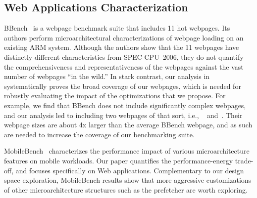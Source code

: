 \subsection{Web Applications Characterization}
\label{sec:arch:related:char}

BBench~\cite{BBench} is a webpage benchmark suite that includes 11 hot webpages. Its authors perform microarchitectural characterizations of webpage loading on an existing ARM system. Although the authors show that the 11 webpages have distinctly different characteristics from SPEC CPU~2006, they do not quantify the comprehensiveness and representativeness of the webpages against the vast number of webpages ``in the wild.'' In stark contrast, our analysis in~ systematically proves the broad coverage of our webpages, which is needed for robustly evaluating the impact of the optimizations that we propose. For example, we find that BBench does not include significantly complex webpages, and our analysis led to including two webpages of that sort, i.e., ~ and~. Their webpage sizes are about 4x larger than the average BBench webpage, and as such are needed to increase the coverage of our benchmarking suite.

MobileBench~\cite{mobilebench} characterizes the performance impact of various microarchitecture features on mobile workloads. Our paper quantifies the performance-energy trade-off, and focuses specifically on Web applications. Complementary to our design space exploration, MobileBench results show that more aggressive customizations of other microarchitecture structures such as the prefetcher are worth exploring.
